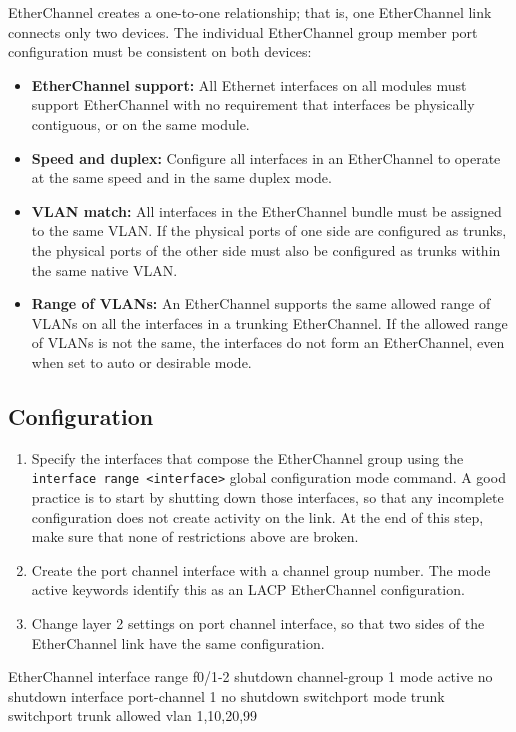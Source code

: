 EtherChannel creates a one-to-one relationship; that is, one EtherChannel link connects only two devices. The individual EtherChannel group member port configuration must be consistent on both devices: 

\begin{itemize}
\item \textbf{EtherChannel support:} All Ethernet interfaces on all modules must support EtherChannel with no requirement that interfaces be physically contiguous, or on the same module.

\item \textbf{Speed and duplex:} Configure all interfaces in an EtherChannel to operate at the same speed and in the same duplex mode.

\item \textbf{VLAN match:} All interfaces in the EtherChannel bundle must be assigned to the same VLAN. If the physical ports of one side are configured as trunks, the physical ports of the other side must also be configured as trunks within the same native VLAN.

\item \textbf{Range of VLANs:} An EtherChannel supports the same allowed range of VLANs on all the interfaces in a trunking EtherChannel. If the allowed range of VLANs is not the same, the interfaces do not form an EtherChannel, even when set to auto or desirable mode.
\end{itemize}

\subsection{Configuration}

\begin{enumerate}
\item Specify the interfaces that compose the EtherChannel group using the \verb|interface range <interface>| global configuration mode command. A good practice is to start by shutting down those interfaces, so that any incomplete configuration does not create activity on the link. At the end of this step, make sure that none of restrictions above are broken.

\item Create the port channel interface with a channel group number. The mode active keywords identify this as an LACP EtherChannel configuration.

\item Change layer 2 settings on port channel interface, so that two sides of the EtherChannel link have the same configuration.
\end{enumerate}

\begin{sexylisting}{EtherChannel}
interface range f0/1-2
  shutdown
  channel-group 1 mode active
  no shutdown
interface port-channel 1
  no shutdown
  switchport mode trunk
  switchport trunk allowed vlan 1,10,20,99  
\end{sexylisting}

